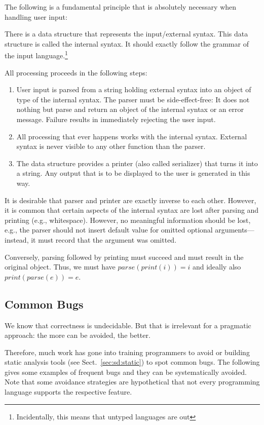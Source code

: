 The following is a fundamental principle that is absolutely necessary when handling user input:
\begin{compactitem}
 \item There is a data structure that represents the input/external syntax.
 This data structure is called the internal syntax.
 It should exactly follow the grammar of the input language.\footnote{Incidentally, this means that untyped languages are out}
 \item All processing proceeds in the following steps:
 \begin{enumerate}
 \item User input is parsed from a string holding external syntax into an object of type of the internal syntax.
  The parser must be side-effect-free: It does not nothing but parse and return an object of the internal syntax or an error message.
  Failure results in immediately rejecting the user input.
  \item All processing that ever happens works with the internal syntax.
  External syntax is never visible to any other function than the parser.
  \item The data structure provides a printer (also called serializer) that turns it into a string.
  Any output that is to be displayed to the user is generated in this way.
 \end{enumerate}
\end{compactitem}

It is desirable that parser and printer are exactly inverse to each other.
However, it is common that certain aspects of the internal syntax are lost after parsing and printing (e.g., whitespace).
However, no meaningful information should be lost, e.g., the parser should not insert default value for omitted optional arguments---instead, it must record that the argument was omitted.

Conversely, parsing followed by printing must succeed and must result in the original object.
Thus, we must have $parse(print(i))=i$ and ideally also $print(parse(e))=e$.
 
\subsection{Common Bugs}\label{sec:sd:commonbugs}

We know that correctness is undecidable.
But that is irrelevant for a pragmatic approach: the more can be avoided, the better.

Therefore, much work has gone into training programmers to avoid or building static analysis tools (see Sect.~\ref{sec:sd:static}) to spot common bugs.
The following gives some examples of frequent bugs and they can be systematically avoided.
Note that some avoidance strategies are hypothetical that not every programming language supports the respective feature.

